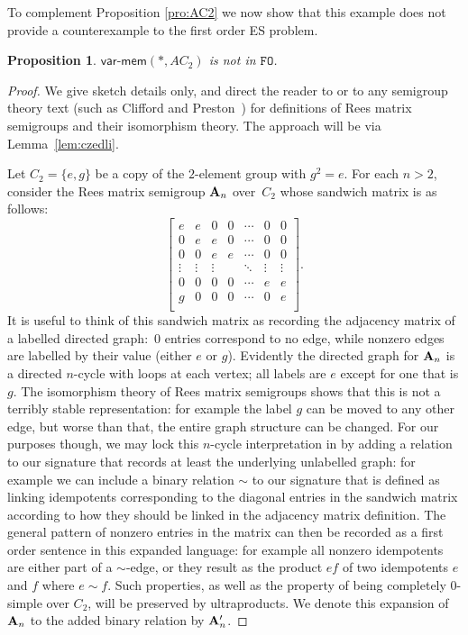 \documentclass[reqno]{amsart}
\theoremstyle{plain}
\newtheorem{pro}[thm]{Proposition}
\theoremstyle{definition}
\newcommand{\varmem}{\textsf{var-mem}}
\begin{document}
To complement Proposition \ref{pro:AC2} we now show that this example does not provide a counterexample to the first order ES problem.
\begin{pro}\label{pro:AC2FO}
$\varmem(*,AC_2)$ is not in $\texttt{FO}$.
\end{pro}
\begin{proof}
We give sketch details only, and direct the reader to \cite{VGK} or to any semigroup theory text (such as Clifford and Preston~\cite{clipre}) for definitions of Rees matrix semigroups and their isomorphism theory.  
The approach will be via Lemma~\ref{lem:czedli}.

Let $C_2=\{e,g\}$ be a copy of the $2$-element group with $g^2=e$.  For each $n>2$, consider the Rees matrix semigroup ${\bf A}_n$ over~$C_2$ whose sandwich matrix is as follows:
\[
\left[\begin{matrix}
e&e&0&0& \cdots &0&0\\
0&e&e&0&\cdots &0&0\\
0&0&e&e&\cdots &0&0\\
\vdots&\vdots&\vdots&&\ddots&\vdots&\vdots\\
0&0&0&0&\cdots &e&e\\
g&0&0&0&\cdots &0&e\\
\end{matrix}\right].
\] 
It is useful to think of this sandwich matrix as recording the adjacency matrix of a labelled directed graph:~$0$ entries correspond to no edge, while nonzero edges are labelled by their value (either $e$ or $g$).  Evidently the directed graph for ${\bf A}_n$ is a directed $n$-cycle with loops at each vertex; all labels are $e$ except for one that is $g$.  The isomorphism theory of Rees matrix semigroups shows that this is not a terribly stable representation: for example the label $g$ can be moved to any other edge, but worse than that, the entire graph structure can be changed.  For our purposes though, we may lock this $n$-cycle interpretation in by adding a relation to our signature that records at least the underlying unlabelled graph: for example we can include a binary relation $\sim$ to our signature that is defined as linking idempotents corresponding to the diagonal entries in the sandwich matrix according to how they should be linked in the adjacency matrix definition.  The general pattern of nonzero entries in the matrix can then be recorded as a first order sentence in this expanded language: for example all nonzero idempotents are either part of a $\sim$-edge, or they result as the product $ef$ of two idempotents $e$ and $f$ where $e\sim f$.  Such properties, as well as the property of being completely $0$-simple over $C_2$, will be preserved by ultraproducts.  We denote this expansion of ${\bf A}_n$ to the added binary relation by ${\bf A}_n'$.


\end{proof}
\end{document}
